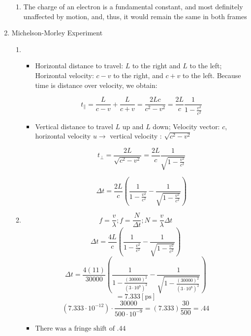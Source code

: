 \begin{enumerate}
\begin{enumerate}
      \item The charge of an electron is a fundamental constant, and most definitely unaffected by motion, and, thus, it would remain the same in both frames

    \end{enumerate}
    
  \item Michelson-Morley Experiment

    \begin{enumerate}

      \item 

        \begin{itemize}

          \item Horizontal distance to travel: $L$ to the right and $L$ to the left; Horizontal velocity: $c-v$ to the right, and $c+v$ to the left. Because time is distance over velocity, we obtain:

            $$t_{\parallel}=\frac{L}{c-v}+\frac{L}{c+v}=\frac{2Lc}{c^2-v^2}=\frac{2L}{c}\frac{1}{1-\frac{v^2}{c^2}}$$

          \item Vertical distance to travel $L$ up and $L$ down; Velocity vector: $c$, horizontal velocity $u\longrightarrow$ vertical velocity : $\sqrt{c^2-v^2}$

            $$t_{\perp}=\frac{2L}{\sqrt{c^2-v^2}}=\frac{2L}{c}\frac{1}{\sqrt{1-\frac{v^2}{c^2}}}$$

            $$\boxed{\Delta t=\frac{2L}{c}\left( \frac{1}{1-\frac{v^2}{c^2}} - \frac{1}{\sqrt{1-\frac{v^2}{c^2}}} \right)}$$

        \end{itemize}

      \item

            $$f=\frac{v}{\lambda}; f=\frac{N}{\Delta t}; N=\frac{v}{\lambda}\Delta t$$
            $$\Delta t=\frac{4L}{c}\left( \frac{1}{1-\frac{v^2}{c^2}} - \frac{1}{\sqrt{1-\frac{v^2}{c^2}}} \right)$$
            $$\Delta t = \frac{4 (11)}{30000}\left( \frac{1}{1-\frac{(30000)^2}{(3\cdot10^8)^2}}-\frac{1}{\sqrt{1-\frac{(30000)^2}{(3\cdot10^8)^2}}} \right)$$
            $$=7.333[\si{\pico\second}]$$
            $$(7.333\cdot10^{-12}) \cdot \frac{30000}{500\cdot10^{-9}}=(7.333)\frac{30}{500} = .44$$

            \begin{itemize}

              \item $\boxed{\text{There was a fringe shift of .44}}$

            \end{itemize}

    \end{enumerate}

\end{enumerate}



